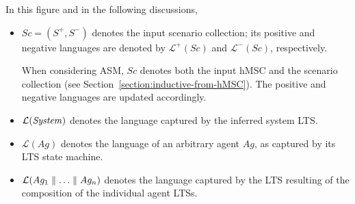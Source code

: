 In this figure and in the following discussions,
\begin{itemize}
\item $Sc = (S^+,S^-)$ denotes the input scenario collection; its positive and negative languages are denoted by $\mathcal{L}^+(Sc)$ and $\mathcal{L}^-(Sc)$, respectively. 

When considering ASM, $Sc$ denotes both the input hMSC and the scenario collection (see Section~\ref{section:inductive-from-hMSC}). The positive and negative languages are updated accordingly. 
\item $\mathcal{L}(\mbox{\emph{System}})$ denotes the language captured by the inferred system LTS.
\item $\mathcal{L}(Ag)$ denotes the language of an arbitrary agent $Ag$, as captured by its LTS state machine.
\item $\mathcal{L}(Ag_1 \parallel \ldots \parallel Ag_n)$ denotes the language captured by the LTS resulting of the composition of the individual agent LTSs.
\end{itemize}

